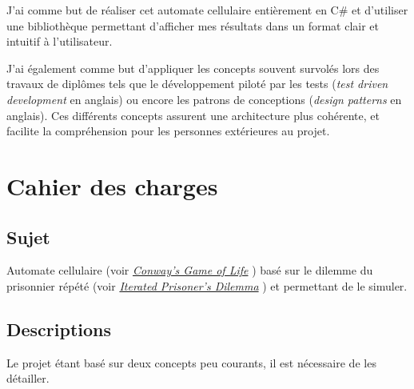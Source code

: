 \documentclass[a4paper, french]{article}
\begin{document}
J'ai comme but de réaliser cet automate cellulaire entièrement en C\# et d'utiliser une bibliothèque permettant d'afficher mes résultats dans un format clair et intuitif à l'utilisateur.

J'ai également comme but d'appliquer les concepts souvent survolés lors des travaux de diplômes tels que le développement piloté par les tests (\textit{test driven development} en anglais) ou encore les patrons de conceptions (\textit{design patterns} en anglais). Ces différents concepts assurent une architecture plus cohérente, et facilite la compréhension pour les personnes extérieures au projet.

\pagebreak
\section{Cahier des charges}
\subsection{Sujet}
Automate cellulaire (voir \href{https://en.wikipedia.org/wiki/Conway's\_Game\_of\_Life}{\textit{Conway's Game of Life}} \cite{GoL}) basé sur le dilemme du prisonnier répété (voir \href{https://en.wikipedia.org/wiki/Prisoner's\_dilemma#The\_iterated\_prisoner.27s\_dilemma}{\textit{Iterated Prisoner's Dilemma}} \cite{DilemmePrisonnier}) et permettant de le simuler.

\subsection{Descriptions}
Le projet étant basé sur deux concepts peu courants, il est nécessaire de les détailler.
\end{document}
